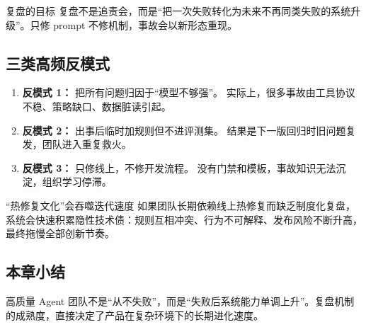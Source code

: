 \begin{importantbox}{复盘的目标}
复盘不是追责会，而是“把一次失败转化为未来不再同类失败的系统升级”。只修 prompt 不修机制，事故会以新形态重现。
\end{importantbox}

\subsection{三类高频反模式}

\begin{enumerate}[leftmargin=1.8em]
    \item \textbf{反模式 1：} 把所有问题归因于“模型不够强”。
    实际上，很多事故由工具协议不稳、策略缺口、数据脏读引起。
    \item \textbf{反模式 2：} 出事后临时加规则但不进评测集。
    结果是下一版回归时旧问题复发，团队进入重复救火。
    \item \textbf{反模式 3：} 只修线上，不修开发流程。
    没有门禁和模板，事故知识无法沉淀，组织学习停滞。
\end{enumerate}

\begin{warningbox}{“热修复文化”会吞噬迭代速度}
如果团队长期依赖线上热修复而缺乏制度化复盘，系统会快速积累隐性技术债：规则互相冲突、行为不可解释、发布风险不断升高，最终拖慢全部创新节奏。
\end{warningbox}

\subsection{本章小结}

高质量 Agent 团队不是“从不失败”，而是“失败后系统能力单调上升”。复盘机制的成熟度，直接决定了产品在复杂环境下的长期进化速度。

